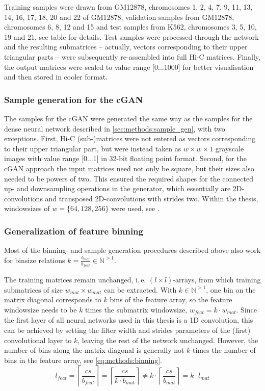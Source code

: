 Training samples were drawn from GM12878, chromosomes 1, 2, 4, 7, 9, 11, 13, 14, 16, 17, 18, 20 and 22 of GM12878, 
validation samples from GM12878, chromosomes 6, 8, 12 and 15 and test samples from K562, chromosomes 3, 5, 10, 19 and 21,
see table \xxx for details.
Test samples were processed through the network and the resulting submatrices -- actually, vectors corresponding to their upper triangular parts -- were subsequently re-assembled into full Hi-C matrices.
Finally, the output matrices were scaled to value range [0...1000] for better visualisation and then stored in cooler format.

\subsubsection{Sample generation for the cGAN}
The samples for the cGAN were generated the same way as the samples for the dense neural network described 
in \cref{sec:methods:sample_gen}, with two exceptions.
First, Hi-C (sub-)matrices were not entered as vectors corresponding to their upper triangular part, 
but were instead taken as $w\times w \times 1$ grayscale images with value range [0...1] in 32-bit floating point format.
Second, for the cGAN approach the input matrices need not only be square,
but their sizes also needed to be powers of two. 
This ensured the required shapes for the connected up- and downsampling operations in the generator, 
which essentially are 2D-convolutions and transposed 2D-convolutions with strides two.
Within the thesis, windowsizes of $w=\{64,128,256\}$ were used, see \xxx.

\subsubsection{Generalization of feature binning} \label{sec:methods:inputBinning}
Most of the binning- and sample generation procedures described above 
also work for binsize relations $k=\frac{b_\mathit{mat}}{b_\mathit{feat}} \in \mathbb{N}^{>1}$.

The training matrices remain unchanged, i.\,e. $(l \times l)$-arrays, from which training submatrices of size  $w_\mathit{mat} \times w_\mathit{mat} $
can be extracted. 
With $k \in \mathbb{N}^{>1}$, one bin on the matrix diagonal corresponds to $k$ bins of the feature array,
so the feature windowsize needs to be $k$ times the submatrix windowsize, $w_\mathit{feat} = k \cdot w_\mathit{mat}$.
Since the first layer of all neural networks used in this thesis is a 1D convolution,
this can be achieved by setting the filter width and strides parameters of the (first) convolutional layer to $k$, leaving the rest of the network unchanged.
However, the number of bins along the matrix diagonal is generally not $k$ times the number of bins in the feature array,
see \cref{eq:methods:binning}.
\begin{equation}
 l_\mathit{feat} = \left \lceil{\frac{cs}{b_\mathit{feat}}}\right \rceil
                = \left \lceil{\frac{cs}{k \cdot b_\mathit{mat}}}\right \rceil 
                \not = k \cdot \left \lceil{\frac{cs}{ b_\mathit{mat}}}\right \rceil
                = k \cdot l_\mathit{mat} \label{eq:methods:binning}
\end{equation}

